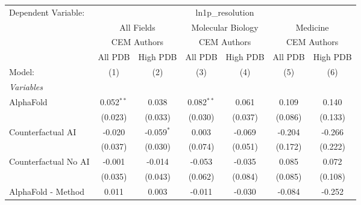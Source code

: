 \begingroup
\centering
\begin{tabular}{lcccccc}
   \tabularnewline \midrule \midrule
   Dependent Variable: & \multicolumn{6}{c}{ln1p\_resolution}\\
 & \multicolumn{2}{c}{All Fields} & \multicolumn{2}{c}{Molecular Biology} & \multicolumn{2}{c}{Medicine} \\
\cmidrule(lr){2-3} \cmidrule(lr){4-5} \cmidrule(lr){6-7}
 & \multicolumn{2}{c}{CEM Authors} & \multicolumn{2}{c}{CEM Authors} & \multicolumn{2}{c}{CEM Authors} \\
\cmidrule(lr){2-3} \cmidrule(lr){4-5} \cmidrule(lr){6-7}
 & \multicolumn{1}{c}{All PDB} & \multicolumn{1}{c}{High PDB} & \multicolumn{1}{c}{All PDB} & \multicolumn{1}{c}{High PDB} & \multicolumn{1}{c}{All PDB} & \multicolumn{1}{c}{High PDB} \\
\cmidrule(lr){2-2} \cmidrule(lr){3-3} \cmidrule(lr){4-4} \cmidrule(lr){5-5} \cmidrule(lr){6-6} \cmidrule(lr){7-7}
   Model:                                                     & (1)          & (2)           & (3)            & (4)            & (5)         & (6)\\  
   \midrule
   \emph{Variables}\\
   AlphaFold                                                  & 0.052$^{**}$ & 0.038         & 0.082$^{**}$   & 0.061          & 0.109       & 0.140\\   
                                                              & (0.023)      & (0.033)       & (0.030)        & (0.037)        & (0.086)     & (0.133)\\   
   Counterfactual AI                                          & -0.020       & -0.059$^{*}$  & 0.003          & -0.069         & -0.204      & -0.266\\   
                                                              & (0.037)      & (0.030)       & (0.074)        & (0.051)        & (0.172)     & (0.222)\\   
   Counterfactual No AI                                       & -0.001       & -0.014        & -0.053         & -0.035         & 0.085       & 0.072\\   
                                                              & (0.035)      & (0.043)       & (0.062)        & (0.084)        & (0.085)     & (0.108)\\   
   AlphaFold - Method                                         & 0.011        & 0.003         & -0.011         & -0.030         & -0.084      & -0.252\\   

\end{tabular}

